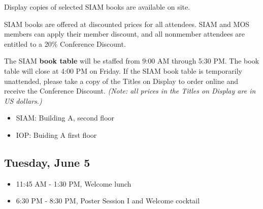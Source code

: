 

\noindent Display copies of selected SIAM books are available on site. 

\bigskip

\noindent SIAM books are offered at discounted prices for all attendees. 
SIAM and MOS members can apply their member discount, and all nonmember attendees are entitled to a 20\% Conference Discount.

\bigskip

\noindent The SIAM \textbf{book table} will be staffed from 9:00 AM through 5:30 PM. 
The book table will close at 4:00 PM on Friday. 
If the SIAM book table is temporarily unattended, please take a copy of the Titles on Display to order online and receive the Conference Discount. 
\textit{(Note: all prices in the Titles on Display are in US dollars.)}


\begin{itemize}
  \item SIAM: Building A, second floor
  \item IOP: Buiding A first floor
\end{itemize}


\subsection*{Tuesday, June 5}

\begin{itemize}
  \item[] 11:45 AM - 1:30 PM, Welcome lunch
  \item[] 6:30 PM - 8:30 PM, Poster Session I and Welcome cocktail
\end{itemize}

